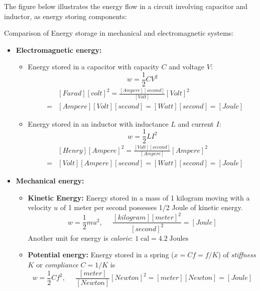 \documentclass{article}
\begin{document}
The figure below illustrates the energy flow in a circuit involving capacitor
and inductor, as energy storing components:








Comparison of Energy storage in mechanical and electromagnetic systems:
\begin{itemize}
\item {\bf Electromagnetic energy:}
  \begin{itemize}
  \item Energy stored in a capacitor with capacity $C$ and voltage $V$:
    \begin{equation}	
      w=\frac{1}{2}CV^2
    \end{equation}
    \begin{eqnarray}
      &&[Farad][volt]^2=\frac{[Ampere][second]}{[Volt]}[Volt]^2
      \nonumber\\
      &=&[Ampere][Volt][second]=[Watt][second]=[Joule]
    \end{eqnarray}
  \item Energy stored in an inductor with inductance $L$ and current $I$:
    \begin{equation}	
      w=\frac{1}{2}LI^2
    \end{equation}
    \begin{eqnarray}
      &&[Henry][Ampere]^2=\frac{[Volt][second]}{[Ampere]}[Ampere]^2
      \nonumber\\
      &=&[Volt][Ampere][second]=[Watt][second]=[Joule]
    \end{eqnarray}
  \end{itemize}
  
\item {\bf Mechanical energy:}
  \begin{itemize}
  \item {\bf Kinetic Energy:} Energy stored in a mass of 1 kilogram
    moving with a velocity $u$ of 1 meter per second possesses 1/2 Joule 
    of kinetic energy.
    \begin{equation}	
      w=\frac{1}{2}mu^2,\;\;\;\;\;\frac{[kilogram][meter]^2}{[second]^2}=[Joule]
    \end{equation}
    Another unit for energy is {\em calorie}:
    $ 1 \; \mbox{cal}=4.2\;\mbox{Joules}	$
    
  \item {\bf Potential energy:} Energy stored in a spring ($x=Cf=f/K$) 
    of {\em stiffness} $K$ or {\em compliance} $C=1/K$ is 
    \begin{equation}
      w=\frac{1}{2}Cf^2,\;\;\;\;\;	
      \frac{[meter]}{[Newton]}[Newton]^2=[meter][Newton]=[Joule]
    \end{equation}	
  \end{itemize}
  
\end{itemize}
\end{document}
